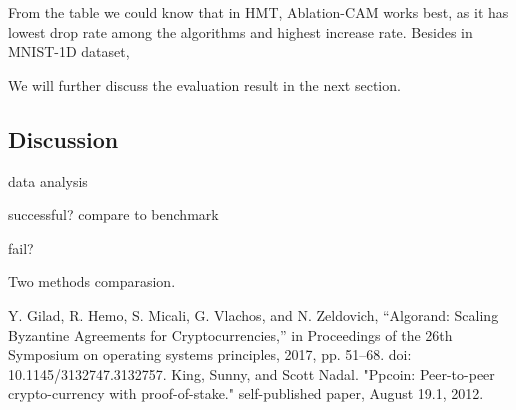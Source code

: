 \documentclass[conference]{IEEEtran}
\begin{document}
	From the table we could know that in HMT, Ablation-CAM works best, as it has lowest drop rate among the algorithms and highest increase rate. Besides in MNIST-1D dataset, %
	\par
	We will further discuss the evaluation result in the next section.
	
	\subsection{Discussion}
	
	data analysis
	
	successful? compare to benchmark
	
	fail?
	
	Two methods comparasion.
	
	\begin{thebibliography}{00}
		Y. Gilad, R. Hemo, S. Micali, G. Vlachos, and N. Zeldovich, “Algorand: Scaling Byzantine Agreements for Cryptocurrencies,” in Proceedings of the 26th Symposium on operating systems principles, 2017, pp. 51–68. doi: 10.1145/3132747.3132757.
		 King, Sunny, and Scott Nadal. "Ppcoin: Peer-to-peer crypto-currency with proof-of-stake." self-published paper, August 19.1, 2012.
		
	\end{thebibliography}
	
\end{document}
